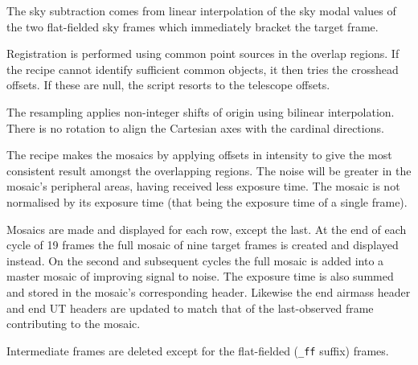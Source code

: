 \documentclass[twoside,11pt,nolof]{starlink}
\begin{document}
{{{         \sstitem
         The sky subtraction comes from linear interpolation of the sky
         modal values of the two flat-fielded sky frames which immediately
         bracket the target frame.

         \sstitem
         Registration is performed using common point sources in the
         overlap regions.  If the recipe cannot identify sufficient common
         objects, it then tries the crosshead offsets.  If these are null,
         the script resorts to the telescope offsets.

         \sstitem
         The resampling applies non-integer shifts of origin using
         bilinear interpolation.  There is no rotation to align the
         Cartesian axes with the cardinal directions.

         \sstitem
         The recipe makes the mosaics by applying offsets in intensity
         to give the most consistent result amongst the overlapping regions.
         The noise will be greater in the mosaic's peripheral areas, having
         received less exposure time.  The mosaic is not normalised by its
         exposure time (that being the exposure time of a single frame).

         \sstitem
         Mosaics are made and displayed for each row, except the last.
         At the end of each cycle of 19 frames the full mosaic of nine target
         frames is created and displayed instead.  On the second and
         subsequent cycles the full mosaic is added into a master mosaic of
         improving signal to noise.  The exposure time is also summed and
         stored in the mosaic's corresponding header.  Likewise the end
         airmass header and end UT headers are updated to match that of
         the last-observed frame contributing to the mosaic.

         \sstitem
         Intermediate frames are deleted except for the flat-fielded ({\tt\_ff}
         suffix) frames.
      }
   }
   }
\end{document}
